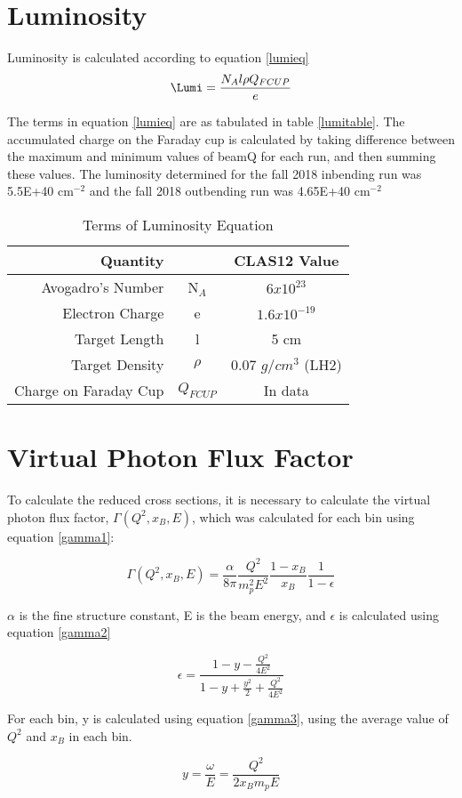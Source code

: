 \section{Luminosity}

Luminosity is calculated according to equation \ref{lumieq}
 \begin{equation}\label{lumieq}
            \Lumi = \frac{N_A l \rho Q_{FCUP}}{e}
\end{equation}

The terms in equation \ref{lumieq} are as tabulated in table \ref{lumitable}. The accumulated charge on the Faraday cup is calculated by taking difference between the maximum and minimum values of beamQ for each run, and then summing these values. The luminosity determined for the fall 2018 inbending run was 5.5E+40 cm$^{-2}$ and the fall 2018 outbending run was 4.65E+40 cm$^{-2}$

\begin{table}[h]
    \centering
    \begin{tabular}{rcc}
        Quantity &  & CLAS12 Value \\\hline
       Avogadro's Number &  N$_A$  & $6x10^{23}$ \\
        Electron Charge &e  &  $1.6x10^{-19}$ \\
        Target Length &l &  5 cm \\
        Target Density &$\rho$  &  0.07 $g/cm^3$ (LH2) \\
        Charge on Faraday Cup & $Q_{FCUP}$ &  In data\\
    \end{tabular}
\caption{Terms of Luminosity Equation}
\end{table}\label{lumitable}

\section{Virtual Photon Flux Factor}
To calculate the reduced cross sections, it is necessary to calculate the virtual photon flux factor, $\Gamma (Q^2, x_B, E)$, which was calculated for each bin using equation \ref{gamma1}:

 \begin{equation}\label{gamma1}
            \Gamma (Q^2, x_B, E) = \frac{\alpha}{8\pi} \frac{Q^2}{m^2_pE^2}\frac{1-x_B}{x_B}\frac{1}{1-\epsilon}
\end{equation}

$\alpha$ is the fine structure constant, E is the beam energy, and $\epsilon$ is calculated using equation \ref{gamma2}

 \begin{equation}\label{gamma2}
            \epsilon = \frac{1-y-\frac{Q^2}{4E^2}}{1-y+\frac{y^2}{2}+\frac{Q^2}{4E^2}}
\end{equation}

For each bin, y is calculated using equation \ref{gamma3}, using the average value of $Q^2$ and $x_B$ in each bin.

 \begin{equation}\label{gamma3}
           y = \frac{\omega}{E} = \frac{Q^2}{2x_Bm_pE}
\end{equation}
